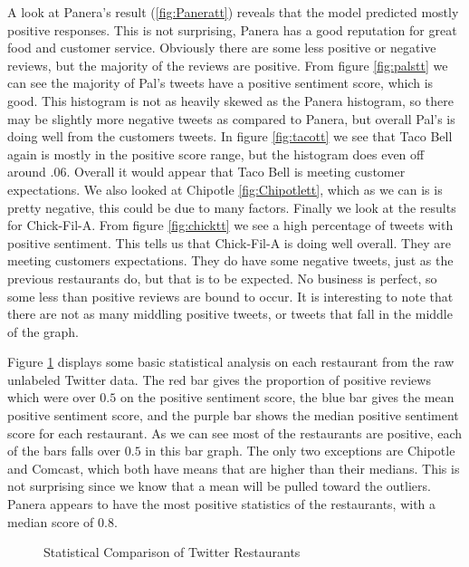 \documentclass[titlepage,letterpaper]{article}
\begin{document}
A look at Panera's result (\cref{fig:Paneratt}) reveals that the model predicted mostly positive responses. This is not surprising, Panera has a good reputation for great food and customer service. Obviously there are some less positive or negative reviews, but the majority of the reviews are positive. From figure \cref{fig:palstt} we can see the majority of Pal's tweets have a positive sentiment score, which is good. This histogram is not as heavily skewed as the Panera histogram, so there may be slightly more negative tweets as compared to Panera, but overall Pal's is doing well from the customers tweets. In figure \cref{fig:tacott} we see that Taco Bell again is mostly in the positive score range, but the histogram does even off around $.06$. Overall it would appear that Taco Bell is meeting customer expectations. We also looked at Chipotle \cref{fig:Chipotlett}, which as we can is is pretty negative, this could be due to many factors. Finally we look at the results for Chick-Fil-A. From figure \cref{fig:chicktt} we see a high percentage of tweets with positive sentiment. This tells us that Chick-Fil-A is doing well overall. They are meeting customers expectations. They do have some negative tweets, just as the previous restaurants do, but that is to be expected. No business is perfect, so some less than positive reviews are bound to occur. It is interesting to note that there are not as many middling positive tweets, or tweets that fall in the middle of the graph. 

Figure \ref{compstat} displays some basic statistical analysis on each restaurant from the raw unlabeled Twitter data. The red bar gives the proportion of positive reviews which were over $0.5$ on the positive sentiment score, the blue bar gives the mean positive sentiment score, and the purple bar shows the median positive sentiment score for each restaurant. As we can see most of the restaurants are positive, each of the bars falls over $0.5$ in this bar graph. The only two exceptions are Chipotle and Comcast, which both have means that are higher than their medians. This is not surprising since we know that a mean will be pulled toward the outliers. Panera appears to have the most positive statistics of the restaurants, with a median score of $0.8$. 

\begin{figure}[]
	\centering
	\caption{Statistical Comparison of Twitter Restaurants}
	
	\label{compstat}
\end{figure}
\end{document}
